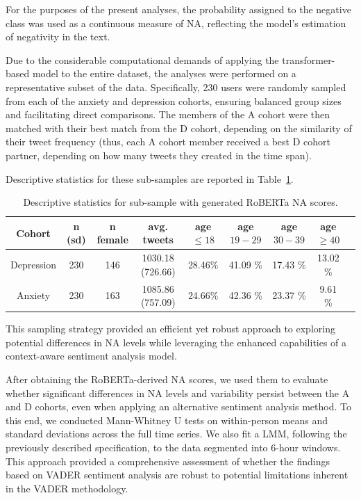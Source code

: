 For the purposes of the present analyses, the probability assigned to the negative class was used as a continuous measure of NA, reflecting the model’s estimation of negativity in the text.

Due to the considerable computational demands of applying the transformer-based model to the entire dataset, the analyses were performed on a representative subset of the data. Specifically, 230 users were randomly sampled from each of the anxiety and depression cohorts, ensuring balanced group sizes and facilitating direct comparisons. The members of the A cohort were then matched with their best match from the D cohort, depending on the similarity of their tweet frequency (thus, each A cohort member received a best D cohort partner, depending on how many tweets they created in the time span).

Descriptive statistics for these sub-samples are reported in Table~\ref{tab:descriptives_subset_roberta}. 

\begin{table}[h]
    \caption{Descriptive statistics for sub-sample with generated RoBERTa NA scores.}
    \centering
    
    \begin{tabular}{ccccccccc}
        \hline
        Cohort & n (sd) & n female & avg. tweets & age $\leq 18$ & age $19-29$ & age $30-39$ & age $\geq 40$  \\
        \hline
        Depression & 230 & 146 & 1030.18 (726.66) & 28.46\% & 41.09 \% & 17.43 \% & 13.02 \% \\
        Anxiety & 230 & 163 & 1085.86 (757.09) & 24.66\% & 42.36 \% & 23.37 \% & 9.61 \% \\
        \hline
    \end{tabular}
    
    \label{tab:descriptives_subset_roberta}
\end{table}

This sampling strategy provided an efficient yet robust approach to exploring potential differences in NA levels while leveraging the enhanced capabilities of a context-aware sentiment analysis model.

After obtaining the RoBERTa-derived NA scores, we used them to evaluate whether significant differences in NA levels and variability persist between the A and D cohorts, even when applying an alternative sentiment analysis method. To this end, we conducted Mann-Whitney U tests on within-person means and standard deviations across the full time series. We also fit a LMM, following the previously described specification, to the data segmented into 6-hour windows. This approach provided a comprehensive assessment of whether the findings based on VADER sentiment analysis are robust to potential limitations inherent in the VADER methodology.

